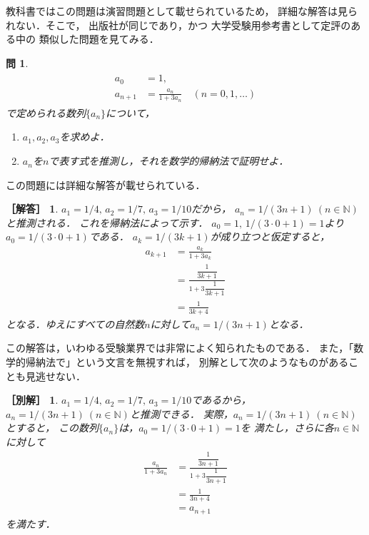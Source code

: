 \documentclass[11pt,a4paper]{ltjsarticle} %
\theoremstyle{mystyle} %
\newtheorem{que}{問} %
\newtheorem*{ans}{［解答］} %
\newtheorem*{ans2}{［別解］} %
\begin{document}
教科書ではこの問題は演習問題として載せられているため，
詳細な解答は見られない．そこで，
出版社が同じであり，かつ
大学受験用参考書として定評のある\cite{chert}中の
類似した問題を見てみる．
\begin{que}
  \begin{align}
    \begin{aligned}
      a_0 & = 1, \\
      a_{n+1} & = \frac{a_n}{1 + 3 a_n} \quad ( n = 0,1,\ldots )
    \end{aligned}
    \label{eq:zenkasiki}
  \end{align}
  で定められる数列$\{ a_n \}$について，
  \begin{enumerate}
    \item $a_1,a_2,a_3$を求めよ．
    \item $a_n$を$n$で表す式を推測し，それを数学的帰納法で証明せよ．
  \end{enumerate}
\end{que}

この問題には詳細な解答が載せられている．

\begin{ans}
  $a_1=1/4, \, a_2 = 1/7 , \, a_3 = 1/10$だから，
  $a_n = 1/(3n+1) \ (n \in \mathbb{N})$と推測される．
  これを帰納法によって示す．
  $a_0 = 1, \, 1/(3 \cdot 0+1)=1$より
  $a_0 = 1/ (3 \cdot 0 +1 )$である．
  $a_k= 1/(3k+1)$が成り立つと仮定すると，
  \begin{align*}
    a_{k+1} & = \frac{a_k}{1+3a_k} \\
            & = \frac{ \dfrac{1}{3k+1} }{ 1 + 3 \dfrac{1}{3k+1} } \\
            & = \frac{1}{3k+4}
  \end{align*}
  となる．ゆえにすべての自然数$n$に対して$a_n=1/(3n+1)$となる．
\end{ans}

この解答は，いわゆる受験業界では非常によく知られたものである．
また，「数学的帰納法で」という文言を無視すれば，
別解として次のようなものがあることも見逃せない．

\begin{ans2}
  $a_1 = 1/4 , \, a_2 = 1/7 , \, a_3 = 1/10$であるから，
  $a_n = 1/(3n+1) \ (n \in \mathbb{N})$と推測できる．
  実際，$a_n = 1/(3n+1) \ (n \in \mathbb{N})$とすると，
  この数列$\{ a_n \}$は，$a_0 = 1/(3 \cdot 0 + 1)=1$を
  満たし，さらに各$n \in \mathbb{N}$に対して
  \begin{align*}
    \frac{a_n}{1+ 3 a_n} & = 
    \frac{ \dfrac{1}{3n+1} }{ 1+ 3 \dfrac{1}{3n+1} } \\
    & = \frac{1}{3n+4} \\
    & = a_{n+1}
  \end{align*}
  を満たす．
\end{ans2}
\end{document}
